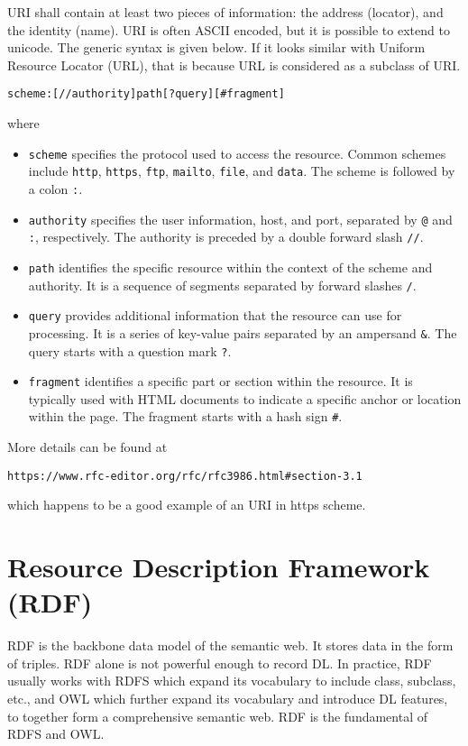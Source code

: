 URI shall contain at least two pieces of information: the address (locator), and the identity (name). URI is often ASCII encoded, but it is possible to extend to unicode. The generic syntax is given below. If it looks similar with Uniform Resource Locator (URL), that is because URL is considered as a subclass of URI.
\begin{lstlisting}
scheme:[//authority]path[?query][#fragment]
\end{lstlisting}
where
\begin{itemize}
\item \verb|scheme| specifies the protocol used to access the resource. Common schemes include \verb|http|, \verb|https|, \verb|ftp|, \verb|mailto|, \verb|file|, and \verb|data|. The scheme is followed by a colon \verb|:|.
\item \verb|authority| specifies the user information, host, and port, separated by \verb|@| and \verb|:|, respectively. The authority is preceded by a double forward slash \verb|//|.
\item \verb|path| identifies the specific resource within the context of the scheme and authority. It is a sequence of segments separated by forward slashes \verb|/|.
\item \verb|query| provides additional information that the resource can use for processing. It is a series of key-value pairs separated by an ampersand \verb|&|. The query starts with a question mark \verb|?|.
\item \verb|fragment| identifies a specific part or section within the resource. It is typically used with HTML documents to indicate a specific anchor or location within the page. The fragment starts with a hash sign \verb|#|.
\end{itemize}
More details can be found at
\begin{lstlisting}
https://www.rfc-editor.org/rfc/rfc3986.html#section-3.1
\end{lstlisting}
which happens to be a good example of an URI in https scheme.

\section{Resource Description Framework (RDF)}

RDF is the backbone data model of the semantic web. It stores data in the form of triples. RDF alone is not powerful enough to record DL. In practice, RDF usually works with RDFS which expand its vocabulary to include class, subclass, etc., and OWL which further expand its vocabulary and introduce DL features, to together form a comprehensive semantic web. RDF is the fundamental of RDFS and OWL.


